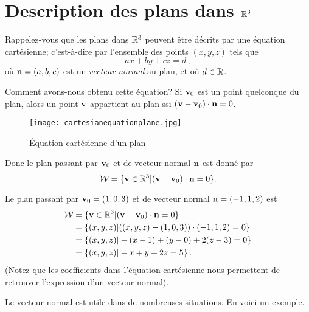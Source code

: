 \section{Description des plans dans \texorpdfstring{$\mathbb{R}^3$}{R3}}
\label{section : description des plans dans R3}

Rappelez-vous que les plans dans $\mathbb{R}^3$ peuvent être décrits par une équation cartésienne; c'est-à-dire par
l'ensemble des points $(x,y,z)$ tels que
$$
ax+by+cz = d\,,
$$
où $\mathbf{n} = (a,b,c)$ est un \emph{vecteur normal} au plan,
et où $d\in \mathbb{R}$.

Comment avons-nous obtenu cette équation? 
Si $\mathbf{v}_0$ est un point quelconque du plan, alors un point $\mathbf{v}$ appartient au plan ssi $(\mathbf{v} - \mathbf{v}_0) \cdot \mathbf{n} = 0$.  
\begin{figure}
\begin{center}


\texttt{[image: cartesianequationplane.jpg]}
\end{center}

\caption{\'Equation cartésienne d'un plan}\label{cartesiannormalformalplane}
\end{figure}

Donc le plan passant par $\mathbf{v}_0$ et de vecteur normal $\mathbf{n}$ est donné par
$$
\mathcal W = \{ \mathbf{v} \in \mathbb{R}^3 | (\mathbf{v} - \mathbf{v}_0) \cdot \mathbf{n} = 0 \}.
$$

\begin{myexample}
Le plan passant par $\mathbf{v}_0 = (1,0,3)$ et de vecteur normal $\mathbf{n} = (-1,1,2)$
est
\begin{align*}
\mathcal W &= \{ \mathbf{v} \in \mathbb{R}^3 | (\mathbf{v}-\mathbf{v}_0)\cdot \mathbf{n}=0\}\\
&= \{ (x,y,z) | ((x,y,z)-(1,0,3))\cdot (-1,1,2)=0\}\\
&= \{ (x,y,z) | -(x-1)+(y-0) + 2(z-3) = 0\}\\
&= \{ (x,y,z) | -x+y+2z = 5\}\,.
\end{align*}
(Notez que les coefficients dans l'équation cartésienne nous permettent de retrouver l'expression d'un vecteur normal).
\end{myexample}

Le vecteur normal est utile dans de nombreuses situations. En voici un exemple.

